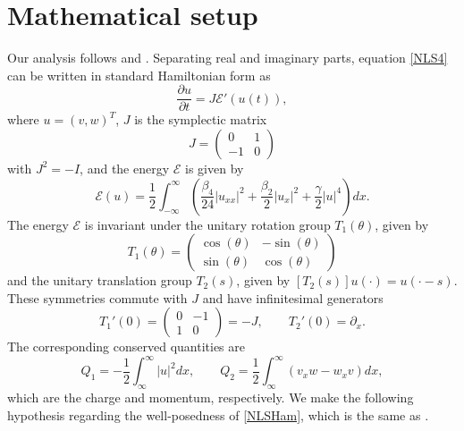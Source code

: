 \documentclass[12pt]{elsarticle}
\def\calE{{\mathcal E}}
\begin{document}
\section{Mathematical setup}\label{sec:setup}

Our analysis follows \cite{Grillakis1990} and \cite[Section 5.2]{Kapitula2013}. Separating real and imaginary parts, equation \cref{NLS4} can be written in standard Hamiltonian form as 
\begin{equation}\label{NLSHam}
\frac{\partial u}{\partial t} = J \calE'(u(t)),
\end{equation}
where $u = (v, w)^T$, $J$ is the symplectic matrix
\begin{equation}
J = \begin{pmatrix}
0 & 1 \\ -1 & 0
\end{pmatrix}
\end{equation}
with $J^2 = -I$, and the energy $\calE$ is given by
\begin{equation}\label{defH}
\calE(u) = \frac{1}{2} \int_{-\infty}^\infty \left( \frac{\beta_4}{24}|u_{xx}|^2 + \frac{\beta_2}{2}|u_{x}|^2 + \frac{\gamma}{2} |u|^4 \right) dx.
\end{equation}
The energy $\mathcal{E}$ is invariant under the unitary rotation group $T_1(\theta)$, given by
\begin{equation}\label{eq:T1}
T_1(\theta) = \begin{pmatrix}
\cos(\theta) & -\sin(\theta) \\ 
\sin(\theta) & \cos(\theta)
\end{pmatrix}
\end{equation}
and the unitary translation group $T_2(s)$, given by $[T_2(s)]u(\cdot) = u(\cdot - s)$. These symmetries commute with $J$ and have infinitesimal generators
\begin{equation}\label{eq:Tgens}
T_1'(0) = \begin{pmatrix}
0 & -1 \\ 
1 & 0
\end{pmatrix} = -J, \qquad T_2'(0) = \partial_x.
\end{equation}
The corresponding conserved quantities are
\begin{equation}
Q_1 = -\frac{1}{2} \int_{\infty}^\infty |u|^2 dx,
\qquad Q_2 = \frac{1}{2} \int_{\infty}^\infty
\left( v_x w - w_x v \right) dx,
\end{equation}
which are the charge and momentum, respectively. We make the following hypothesis regarding the well-posedness of \cref{NLSHam}, which is the same as \cite[Assumption 1]{Grillakis1990}.
\end{document}
